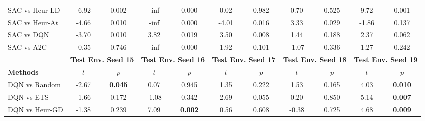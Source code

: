 \begin{tabular}{lcccccccccc}
	SAC vs Heur-LD   & -6.92          & 0.002                  & -inf           & 0.000                  & 0.02           & 0.982                  & 0.70           & 0.525                  & 9.72           & 0.001                  \\
	SAC vs Heur-A$t$ & -4.66          & 0.010                  & -inf           & 0.000                  & -4.01          & 0.016                  & 3.33           & 0.029                  & -1.86          & 0.137                  \\
	SAC vs DQN       & -3.70          & 0.010                  & 3.82           & 0.019                  & 3.50           & 0.008                  & 1.44           & 0.188                  & 2.37           & 0.062                  \\
	SAC vs A2C       & -0.35          & 0.746                  & -inf           & 0.000                  & 1.92           & 0.101                  & -1.07          & 0.336                  & 1.27           & 0.242                  \\
	\midrule 
	& \multicolumn{2}{c}{\textbf{Test Env. Seed 15}} & \multicolumn{2}{c}{\textbf{Test Env. Seed 16}} & \multicolumn{2}{c}{\textbf{Test Env. Seed 17}} & \multicolumn{2}{c}{\textbf{Test Env. Seed 18}} & \multicolumn{2}{c}{\textbf{Test Env. Seed 19}} \\
	\cmidrule(lr){2-3} \cmidrule(lr){4-5} \cmidrule(lr){6-7} \cmidrule(lr){8-9} \cmidrule(lr){10-11}
	\textbf{Methods} & $t$              & $p$                         & $t$              & $p$                         & $t$              & $p$                         & $t$              & $p$                         & $t$              & $p$                         \\
	\midrule 
	DQN vs Random    & -2.67          & \textbf{0.045}         & 0.07           & 0.945                  & 1.35           & 0.222                  & 1.53           & 0.165                  & 4.03           & \textbf{0.010}         \\
	DQN vs ETS       & -1.66          & 0.172                  & -1.08          & 0.342                  & 2.69           & 0.055                  & 0.20           & 0.850                  & 5.14           & \textbf{0.007}         \\
	DQN vs Heur-GD   & -1.38          & 0.239                  & 7.09           & \textbf{0.002}         & 0.56           & 0.608                  & -0.38          & 0.725                  & 4.68           & \textbf{0.009}         \\

\end{tabular}
